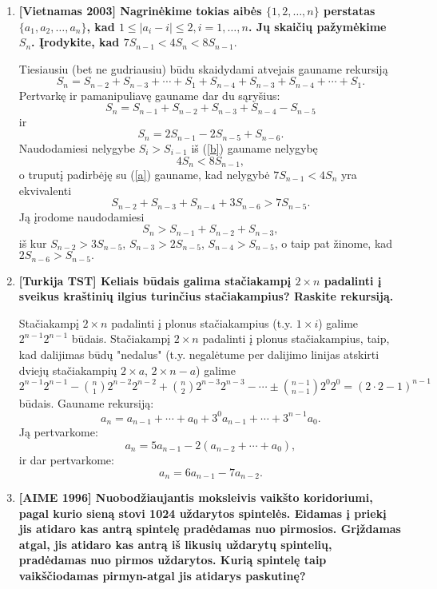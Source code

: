 \begin{enumerate}
\item {\bf [Vietnamas 2003] Nagrinėkime tokias aibės $\{1,2,\dots,n\}$ perstatas $\{a_1, a_2,\dots,a_n\}$, kad $1 \leq |a_i - i| \leq 2, i=1,\dots,n$. Jų skaičių pažymėkime $S_n$. Įrodykite, kad $7S_{n-1}<4S_n<8S_{n-1}.$}

Tiesiausiu (bet ne gudriausiu) būdu skaidydami atvejais gauname rekursiją $$S_n = S_{n-2} + S_{n-3} + \cdots + S_1 + S_{n-4} + S_{n-3} + S_{n-4} + \cdots + S_1.$$ Pertvarkę ir pamanipuliavę gauname dar du sąryšius: \begin{equation}\label{a}S_n = S_{n-1} + S_{n-2} + S_{n-3} + S_{n-4} - S_{n-5}\end{equation} ir \begin{equation}\label{b}S_n = 2S_{n-1} -2S_{n-5} + S_{n-6}.\end{equation} Naudodamiesi nelygybe $S_{i} > S_{i-1}$ iš (\ref{b}) gauname nelygybę $$4S_n < 8S_{n-1},$$ o truputį padirbėję su (\ref{a}) gauname, kad nelygybė $7S_{n-1} < 4S_n$ yra ekvivalenti $$S_{n-2} + S_{n-3} + S_{n-4} + 3S_{n-6} > 7S_{n-5}.$$ Ją įrodome naudodamiesi $$S_n > S_{n-1} + S_{n-2} + S_{n-3},$$ iš kur $S_{n-2} > 3S_{n-5}$, $S_{n-3} > 2S_{n-5}$, $S_{n-4} > S_{n-5}$, o taip pat žinome, kad $2S_{n-6} > S_{n-5}.$ \medskip

\item {\bf [Turkija TST] Keliais būdais galima stačiakampį $2\times n$ padalinti į sveikus kraštinių ilgius turinčius stačiakampius? Raskite rekursiją.}

Stačiakampį $2\times n$ padalinti į plonus stačiakampius (t.y. $1\times i$) galime $2^{n-1}2^{n-1}$ būdais. Stačiakampį $2\times n$ padalinti į plonus stačiakampius, taip, kad dalijimas būdų "nedalus" (t.y. negalėtume per dalijimo linijas atskirti dviejų stačiakampių $2\times a$, $2\times n-a$) galime $2^{n-1}2^{n-1} - \binom{n}{1}2^{n-2}2^{n-2} + \binom{n}{2}2^{n-3}2^{n-3} - \cdots \pm \binom{n-1}{n-1}2^{0}2^{0} = (2\cdot 2 - 1)^{n-1}$ būdais. Gauname rekursiją:
$$a_n = a_{n-1} + \cdots + a_0 + 3^0a_{n-1} + \cdots + 3^{n-1}a_0.$$ Ją pertvarkome: 
$$a_n = 5a_{n-1} - 2(a_{n-2} + \cdots + a_0),$$ ir dar pertvarkome:
$$a_n = 6a_{n-1} - 7a_{n-2}.$$ \medskip

\item {\bf [AIME 1996] Nuobodžiaujantis moksleivis vaikšto koridoriumi, pagal kurio sieną stovi 1024 uždarytos spintelės. Eidamas į priekį jis atidaro kas antrą spintelę pradėdamas nuo pirmosios. Grįždamas atgal, jis atidaro kas antrą iš likusių uždarytų spintelių, pradėdamas nuo pirmos uždarytos. Kurią spintelę taip vaikščiodamas pirmyn-atgal jis atidarys paskutinę?}


\end{enumerate}

